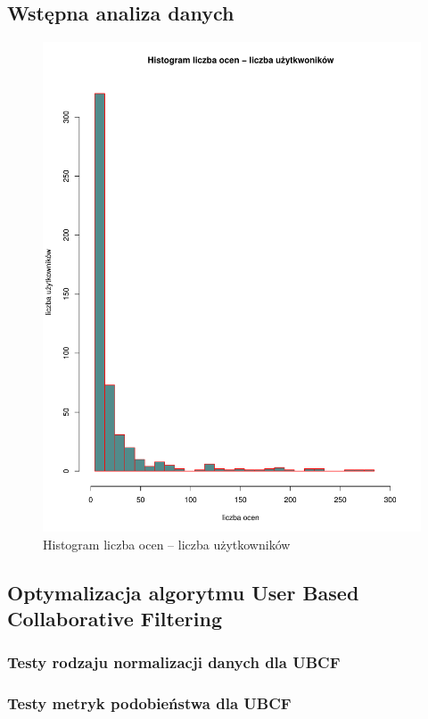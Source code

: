 \documentclass[12pt]{article}
\begin{document}
\begin{flushleft}
\subsection{Wstępna analiza danych}
\begin{figure}[H]
\centering
\includegraphics[scale=0.4]{ocenyUzytkownicy.pdf}
\caption[]{Histogram liczba ocen -- liczba użytkowników}
\end{figure}

\subsection{Optymalizacja algorytmu User Based Collaborative Filtering}
\subsubsection{Testy rodzaju normalizacji danych dla UBCF}
\subsubsection{Testy metryk podobieństwa dla UBCF}

\end{flushleft}
\end{document}
